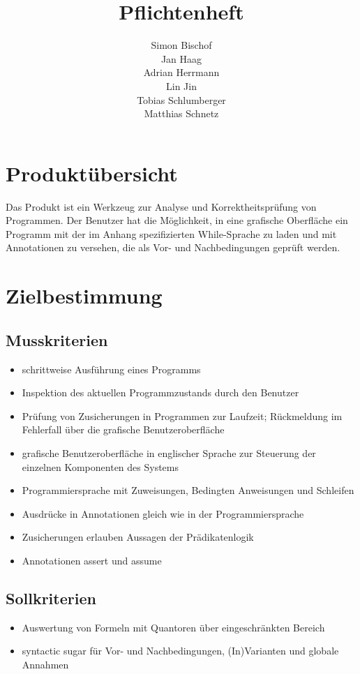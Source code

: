 \documentclass[a4paper,10pt]{article}
\title{Pflichtenheft}
\author{Simon Bischof\\
Jan Haag\\
Adrian Herrmann\\
Lin Jin\\
Tobias Schlumberger\\
Matthias Schnetz}
\begin{document}
\maketitle
\newpage
\tableofcontents
\newpage

\section{Produktübersicht}

Das Produkt ist ein Werkzeug zur Analyse und Korrektheitsprüfung von Programmen. Der Benutzer hat die Möglichkeit, in eine grafische Oberfläche ein Programm mit der im Anhang spezifizierten While-Sprache zu laden und mit Annotationen zu versehen, die als Vor- und Nachbedingungen geprüft werden.

\section{Zielbestimmung}

\subsection{Musskriterien}
\begin{itemize}
  \item schrittweise Ausführung eines Programms
  \item Inspektion des aktuellen Programmzustands durch den Benutzer
  \item Prüfung von Zusicherungen in Programmen zur Laufzeit; Rückmeldung im  Fehlerfall über die grafische Benutzeroberfläche
  \item grafische Benutzeroberfläche in englischer Sprache zur Steuerung der einzelnen Komponenten des Systems
  \item Programmiersprache mit Zuweisungen, Bedingten Anweisungen und Schleifen
  \item Ausdrücke in Annotationen gleich wie in der Programmiersprache
  \item Zusicherungen erlauben Aussagen der Prädikatenlogik
  \item Annotationen assert und assume
\end{itemize}

\subsection{Sollkriterien}
\begin{itemize}
  \item Auswertung von Formeln mit Quantoren über eingeschränkten Bereich
  \item syntactic sugar für Vor- und Nachbedingungen, (In)Varianten und globale Annahmen
\end{itemize}
\end{document}
